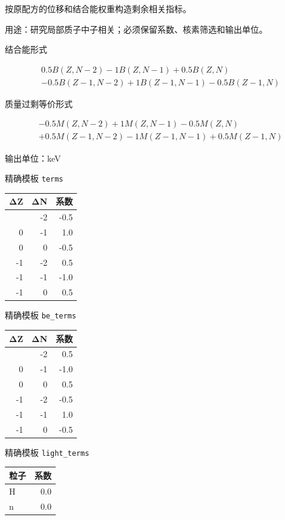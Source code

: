 \documentclass[
  11pt,
  letterpaper,
]{article}
\begin{document}
按原配方的位移和结合能权重构造剩余相关指标。

用途：研究局部质子中子相关；必须保留系数、核素筛选和输出单位。

结合能形式

\[
\begin{aligned}
& 0.5B(Z,N-2)-1B(Z,N-1)+0.5B(Z,N) \\
& -0.5B(Z-1,N-2)+1B(Z-1,N-1)-0.5B(Z-1,N)
\end{aligned}
\]

质量过剩等价形式

\[
\begin{aligned}
& -0.5M(Z,N-2)+1M(Z,N-1)-0.5M(Z,N) \\
& +0.5M(Z-1,N-2)-1M(Z-1,N-1)+0.5M(Z-1,N)
\end{aligned}
\]

输出单位：keV

精确模板 \texttt{terms}

\begin{longtable}[]{@{}rrr@{}}
\toprule\noalign{}
ΔZ & ΔN & 系数 \\
\midrule\noalign{}
\endhead
\bottomrule\noalign{}
\endlastfoot
0 & -2 & -0.5 \\
0 & -1 & 1.0 \\
0 & 0 & -0.5 \\
-1 & -2 & 0.5 \\
-1 & -1 & -1.0 \\
-1 & 0 & 0.5 \\
\end{longtable}

精确模板 \texttt{be\_terms}

\begin{longtable}[]{@{}rrr@{}}
\toprule\noalign{}
ΔZ & ΔN & 系数 \\
\midrule\noalign{}
\endhead
\bottomrule\noalign{}
\endlastfoot
0 & -2 & 0.5 \\
0 & -1 & -1.0 \\
0 & 0 & 0.5 \\
-1 & -2 & -0.5 \\
-1 & -1 & 1.0 \\
-1 & 0 & -0.5 \\
\end{longtable}

精确模板 \texttt{light\_terms}

\begin{longtable}[]{@{}lr@{}}
\toprule\noalign{}
粒子 & 系数 \\
\midrule\noalign{}
\endhead
\bottomrule\noalign{}
\endlastfoot
H & 0.0 \\
n & 0.0 \\
\end{longtable}
\end{document}
